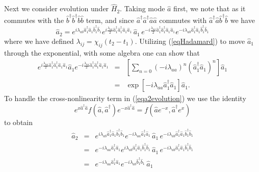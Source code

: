 \documentclass{iopart}
\begin{document}
Next we consider evolution under $\hat{H}_2$. Taking mode $\hat{a}$ first, we note that as it commutes with the $\hat{b}^{\dagger} \hat{b}^{\dagger} \hat{b} \hat{b}$ term, and since $\hat{a}^{\dagger} \hat{a}^{\dagger} \hat{a} \hat{a}$ commutes with $\hat{a}^{\dagger} \hat{a} \hat{b}^{\dagger} \hat{b}$ we have
\begin{equation}
\hat{a}_2 = e^{i \lambda_{ab} \hat{a}_1^{\dagger} \hat{a}_1 \hat{b}_1^{\dagger} \hat{b}_1 } 
          e^{ i \frac{\lambda_{aa}} {2} \hat{a}_1^{\dagger} \hat{a}_1^{\dagger} \hat{a}_1 \hat{a}_1}\, \hat{a}_1 \,  
          e^{ -i \frac{\lambda_{aa}}{2} \hat{a}_1^{\dagger} \hat {a}_1^{\dagger} \hat{a}_1 \hat{a}_1 }
          e^{-i \lambda_{ab} \hat{a}_1^{\dagger} \hat{a}_1 \hat{b}_1^{\dagger} \hat{b}_1}
\label{eqa2evolution}
\end{equation}
where we have defined $\lambda_{ij} = \chi_{ij} (t_2-t_1)$. Utilizing (\ref{eqHadamard}) to move $\hat{a}_1$ through the exponential, with some algebra one can show that
\begin{eqnarray}
e^{ i \frac{\lambda_{aa}} {2} \hat{a}_1^{\dagger} \hat{a}_1^{\dagger} \hat{a}_1 \hat{a}_1} \hat{a}_1 
         e^{ -i \frac{\lambda_{aa}} {2} \hat{a}_1^{\dagger} \hat{a}_1^{\dagger} \hat{a}_1 \hat{a}_1} &=& \left[ \sum_{n=0} (-i \lambda_{aa})^n (\hat{a}_1^{\dagger} \hat{a}_1)^n \right] \hat{a}_1 \nonumber \nonumber \\
   &=& \exp[-i \lambda_{aa} \hat{a}_1^{\dagger} \hat{a}_1] \hat{a}_1.
\end{eqnarray}
To handle the cross-nonlinearity term in (\ref{eqa2evolution}) we use the identity \cite{louisell}
\begin{equation}
e^{x \hat{a}^{\dagger} \hat{a}} f(\hat{a}, \hat{a}^{\dagger}) e^{-x \hat{a}^{\dagger} \hat{a}} = f(\hat{a}e^{-x}, \hat{a}^{\dagger} e^{x})
\label{eqefeidentity}
\end{equation}
to obtain
\begin{eqnarray}
\hat{a}_2 &=& e^{i \lambda_{ab} \hat{a}_1^{\dagger} \hat{a}_1 \hat{b}_1^{\dagger} \hat{b}_1 } 
          e^{-i \lambda_{aa} \hat{a}_1^{\dagger} \hat{a}_1} \, \hat{a}_1 \,
          e^{-i \lambda_{ab} \hat{a}_1^{\dagger} \hat{a}_1 \hat{b}_1^{\dagger} \hat{b}_1} \nonumber \\
%
          &=& e^{-i \lambda_{aa} \hat{a}_1^{\dagger} \hat{a}_1} 
              e^{i \lambda_{ab} \hat{a}_1^{\dagger} \hat{a}_1 \hat{b}_1^{\dagger} \hat{b}_1 } \, \hat{a}_1 \,
          e^{-i \lambda_{ab} \hat{a}_1^{\dagger} \hat{a}_1 \hat{b}_1^{\dagger} \hat{b}_1} \nonumber \\
%
          &=& e^{-i \lambda_{aa} \hat{a}_1^{\dagger} \hat{a}_1} e^{-i \lambda_{ab} \hat{b}_1^{\dagger} \hat{b}_1} \, \hat{a}_1
\label{eqa2}
\end{eqnarray}
\end{document}
